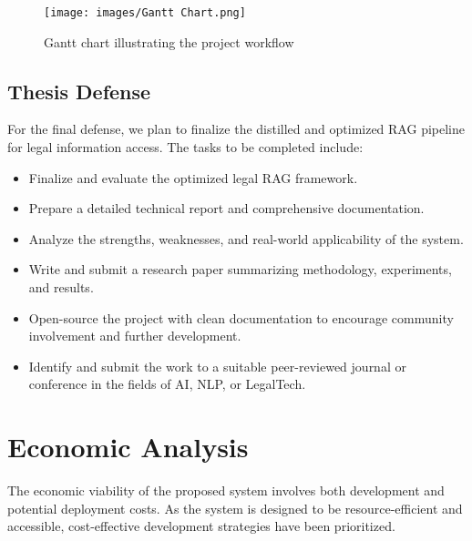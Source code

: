 \begin{figure}[H]
    \centering
    \texttt{[image: images/Gantt Chart.png]}
    \caption{Gantt chart illustrating the project workflow}
    \label{fig:Gantt chart illustrating the project workflow}
\end{figure}
\subsection{Thesis Defense}

For the final defense, we plan to finalize the distilled and optimized RAG pipeline for legal information access. The tasks to be completed include:

\begin{itemize}
    \item Finalize and evaluate the optimized legal RAG framework.
    \item Prepare a detailed technical report and comprehensive documentation.
    \item Analyze the strengths, weaknesses, and real-world applicability of the system.
    \item Write and submit a research paper summarizing methodology, experiments, and results.
    \item Open-source the project with clean documentation to encourage community involvement and further development.
    \item Identify and submit the work to a suitable peer-reviewed journal or conference in the fields of AI, NLP, or LegalTech.
\end{itemize}


\section{Economic Analysis}


The economic viability of the proposed system involves both development and potential deployment costs. As the system is designed to be resource-efficient and accessible, cost-effective development strategies have been prioritized.

